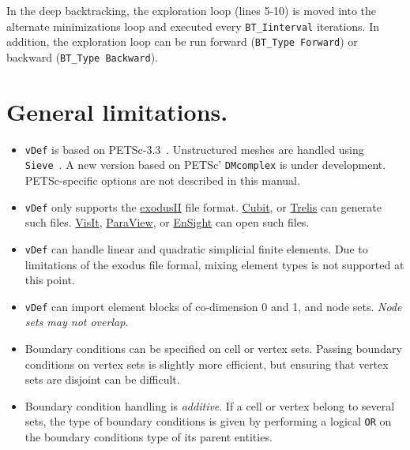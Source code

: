 \documentclass[10pt,oneside]{memoir}
\def\vDef{{\texttt{vDef}} }
\begin{document}
In the deep backtracking, the exploration loop (lines 5-10) is moved into the alternate minimizations loop and executed every \verb+BT_Iinterval+ iterations. In addition, the exploration loop can be run forward (\verb+BT_Type Forward+) or backward (\verb+BT_Type Backward+).

\section{General limitations.}
\begin{itemize}
\item \vDef is based on PETSc-3.3~\cite{petsc-efficient,petsc-user-ref,petsc-web-page}. Unstructured meshes are handled using \texttt{Sieve}~\cite{Knepley-Karpeev-2009a}. A new version based on PETSc' \texttt{DMcomplex} is under development. PETSc-specific options are not described in this manual.
\item \vDef only supports the \href{http://sourceforge.net/projects/exodusii/}{exodusII} file format. \href{http://cubit.sandia.gov}{Cubit}, or \href{http://www.csimsoft.com/trelis.jsp}{Trelis} can generate such files. \href{https://wci.llnl.gov/codes/visit/}{VisIt}, \href{http://paraview.org}{ParaView}, or \href{http://www.ceisoftware.com}{EnSight} can open such files.
\item \vDef can handle linear and quadratic simplicial finite elements. Due to limitations of the exodus file formal, mixing element types is not supported at this point.
\item \vDef can import element blocks of co-dimension 0 and 1, and node sets. \emph{Node sets may not overlap}.
\item Boundary conditions can be specified on cell or vertex sets. Passing boundary conditions on vertex sets is slightly more efficient, but ensuring that vertex sets are disjoint can be difficult.
\item Boundary condition handling is \emph{additive}. If a cell or vertex belong to several sets, the type of boundary conditions is given by performing a logical \verb+OR+ on the boundary conditions type of its parent entities. 
\end{itemize}
\end{document}
